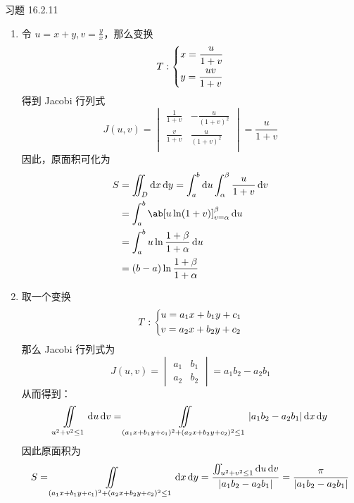 \begin{problem}
	习题 16.2.11
	\begin{solution}
		\begin{enumerate}
			\item[\textbf{1)}] 令 $u = x + y, v = \frac{y}{x}$，那么变换
			$$
			T: \begin{dcases}
				x = \frac{u}{1 + v} \\
				y = \frac{uv}{1 + v} \\
			\end{dcases}
			$$
			得到 Jacobi 行列式
			$$
			J(u, v) = \begin{vmatrix}
				\frac{1}{1 + v} & -\frac{u}{(1 + v)^2} \\
				\frac{v}{1 + v} & \frac{u}{(1 + v)^2} \\ 
			\end{vmatrix} = \frac{u}{1 + v}
			$$
			因此，原面积可化为
			$$
			\begin{aligned}
				S & = \iint_D \dd{x} \dd{y} = \int_{a}^{b} \dd{u} \int_{\alpha}^{\beta} \frac{u}{1 + v} \dd{v} \\
				& = \int_{a}^{b} \ab[u \ln (1 + v)]_{v = \alpha}^{\beta} \dd{u} \\
				& = \int_{a}^{b} u \ln \frac{1 + \beta}{1 + \alpha} \dd{u} \\
				& = (b - a) \ln \frac{1 + \beta}{1 + \alpha}
			\end{aligned}
			$$

			\item[\textbf{3)}] 取一个变换
			$$
			T: \begin{dcases}
				u = a_1 x + b_1 y + c_1 \\
				v = a_2 x + b_2 y + c_2 \\
			\end{dcases}
			$$
			那么 Jacobi 行列式为
			$$
			J(u, v) = \begin{vmatrix}
				a_1 & b_1 \\
				a_2 & b_2 
			\end{vmatrix} = a_1 b_2 - a_2 b_1
			$$
			从而得到：
			$$
			\iint\limits_{u^2 + v^2 \le 1} \dd{u} \dd{v} = \iint\limits_{(a_1 x + b_1 y + c_1)^2 + (a_2 x + b_2 y + c_2)^2 \le 1} \abs{a_1 b_2 - a_2 b_1} \dd{x} \dd{y}
			$$
			因此原面积为
			$$
			S = \iint\limits_{(a_1 x + b_1 y + c_1)^2 + (a_2 x + b_2 y + c_2)^2 \le 1} \dd{x} \dd{y} = \frac{\iint_{u^2 + v^2 \le 1} \dd{u} \dd{v}}{\abs{a_1 b_2 - a_2 b_1}} = \frac{\pi}{\abs{a_1 b_2 - a_2 b_1}}
			$$
		\end{enumerate}
	\end{solution}
\end{problem}

